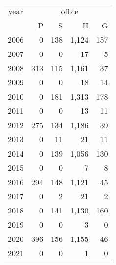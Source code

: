 \footnotesize\begin{tabular}[t]{lrrrr}
\toprule
\multicolumn{1}{c}{year} & \multicolumn{4}{c}{office} \\
\cmidrule(l{3pt}r{3pt}){1-1} \cmidrule(l{3pt}r{3pt}){2-5}
  & P & S & H & G\\
\midrule
2006 & 0 & 138 & 1,124 & 157\\
2007 & 0 & 0 & 17 & 5\\
2008 & 313 & 115 & 1,161 & 37\\
2009 & 0 & 0 & 18 & 14\\
2010 & 0 & 181 & 1,313 & 178\\
2011 & 0 & 0 & 13 & 11\\
2012 & 275 & 134 & 1,186 & 39\\
2013 & 0 & 11 & 21 & 11\\
2014 & 0 & 139 & 1,056 & 130\\
2015 & 0 & 0 & 7 & 8\\
2016 & 294 & 148 & 1,121 & 45\\
2017 & 0 & 2 & 21 & 2\\
2018 & 0 & 141 & 1,130 & 160\\
2019 & 0 & 0 & 3 & 0\\
2020 & 396 & 156 & 1,155 & 46\\
2021 & 0 & 0 & 1 & 0\\
\bottomrule
\end{tabular}
